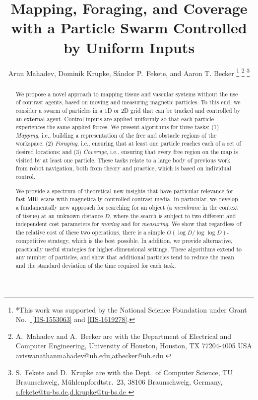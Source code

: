 \documentclass[letterpaper, 10 pt, conference]{ieeeconf}
\title{\LARGE \bf Mapping, Foraging, and Coverage\\ with a Particle Swarm Controlled by Uniform Inputs}
\author{Arun Mahadev, Dominik Krupke, S\'{a}ndor P.~Fekete, and Aaron T. Becker%
\thanks{*This work was supported by the National Science Foundation under Grant No.\ \href{http://nsf.gov/awardsearch/showAward?AWD_ID=1553063}{ [IIS-1553063]} and \href{http://nsf.gov/awardsearch/showAward?AWD_ID=1619278}{[IIS-1619278]}.}%
\thanks{A.~Mahadev and A.~Becker are with the Department of Electrical and Computer Engineering,  University of Houston, Houston, TX 77204-4005 USA 
      \protect\url{ aviswanathanmahadev@uh.edu,atbecker@uh.edu }}
\thanks{S.~Fekete and D.~Krupke are with the Dept.~of Computer Science, TU Braunschweig,  M\"uhlenpfordtstr.~23, 38106 Braunschweig, Germany,
      \protect\url{s.fekete@tu-bs.de,d.krupke@tu-bs.de  }
} %
}
\begin{document}
\maketitle
\thispagestyle{empty}
\pagestyle{empty}


\begin{abstract}
We propose a novel approach to mapping tissue and vascular systems without the use of contrast agents,
based on moving and measuring magnetic particles.
To this end, we consider a swarm of particles in a 1D or 2D grid that can be tracked and controlled by an external agent. 
Control inputs are applied uniformly so that each particle experiences the same applied forces. 
We present algorithms for three tasks: (1) {\em Mapping}, i.e., building a representation of the free and obstacle regions of the workspace;
(2) {\em Foraging}, i.e., ensuring that at least one particle reaches each of a set of desired locations; 
and (3) {\em Coverage}, i.e., ensuring that every free region on the map is visited by at least one particle.
These tasks relate to a large body of previous work from robot navigation, both from theory and practice, 
which is based on individual control.

We provide a spectrum of theoretical new insights 
that have particular relevance for fast MRI scans with magnetically controlled contrast media.
In particular, we develop a fundamentally new approach 
for searching for an object (a {\em membrane} in the context of tissue) at an unknown distance $D$, where the search is 
subject to two different and independent cost parameters
for {\em moving} and for {\em measuring}. We show that regardless of the relative cost of these two operations,
there is a simple $O(\log D/\log\log D)$-competitive strategy, which is the best possible.
In addition, we provide alternative, practically useful strategies for higher-dimensional
settings.
These algorithms extend to any number of particles, and show that additional
particles tend to reduce the mean and the standard deviation of the time required for each task.  %


\end{abstract}
\end{document}
